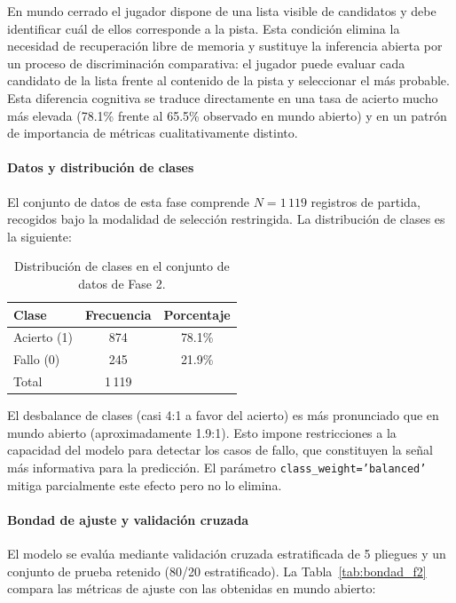 En mundo cerrado el jugador dispone de una lista visible de candidatos y debe identificar cuál de ellos corresponde a la pista. Esta condición elimina la necesidad de recuperación libre de memoria y sustituye la inferencia abierta por un proceso de discriminación comparativa: el jugador puede evaluar cada candidato de la lista frente al contenido de la pista y seleccionar el más probable. Esta diferencia cognitiva se traduce directamente en una tasa de acierto mucho más elevada (78.1\% frente al 65.5\% observado en mundo abierto) y en un patrón de importancia de métricas cualitativamente distinto.

\paragraph{Datos y distribución de clases}

El conjunto de datos de esta fase comprende \textbf{$N = 1\,119$} registros de partida, recogidos bajo la modalidad de selección restringida. La distribución de clases es la siguiente:

\begin{table}[H]
\centering
\begin{tabular}{lcc}
\hline
Clase & Frecuencia & Porcentaje \\
\hline
Acierto (1) & 874 & 78.1\% \\
Fallo (0)   & 245 & 21.9\% \\
\hline
Total & 1\,119 & \\
\hline
\end{tabular}
\caption{Distribución de clases en el conjunto de datos de Fase 2.}
\label{tab:clases_f2}
\end{table}

El desbalance de clases (casi 4:1 a favor del acierto) es más pronunciado que en mundo abierto (aproximadamente 1.9:1). Esto impone restricciones a la capacidad del modelo para detectar los casos de fallo, que constituyen la señal más informativa para la predicción. El parámetro \texttt{class\_weight='balanced'} mitiga parcialmente este efecto pero no lo elimina.

\paragraph{Bondad de ajuste y validación cruzada}

El modelo se evalúa mediante validación cruzada estratificada de 5 pliegues y un conjunto de prueba retenido (80/20 estratificado). La Tabla~\ref{tab:bondad_f2} compara las métricas de ajuste con las obtenidas en mundo abierto:

